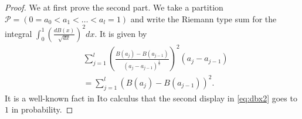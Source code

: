 \documentclass[reqno,12pt]{amsart}
\theoremstyle{plain}
\theoremstyle{definition}
\begin{document}
\begin{proof}
We at first prove the second part. We take a partition $\mathcal{P}=(0=a_{0}<a_{1}<\ldots< a_{l}=1)$ and write the Riemann type sum for the integral $\int_{0}^{1} \left( \frac{dB(x)}{\sqrt{dx}} \right)^{2} dx$. It is given by 
\begin{equation}\label{eq:dbx2}
\begin{split}
&\sum_{j=1}^{l} \left(\frac{B(a_{j})-B(a_{j-1})}{(a_{j}-a_{j-1})^{\frac{1}{2}}}\right)^{2}(a_{j}-a_{j-1})\\
&= \sum_{j=1}^{l} \left(B(a_{j}) - B(a_{j-1}) \right)^2.
\end{split}
\end{equation}
It is a well-known fact in Ito calculus that the second display in \eqref{eq:dbx2} goes to $1$ in probability.


\end{proof}
\end{document}
